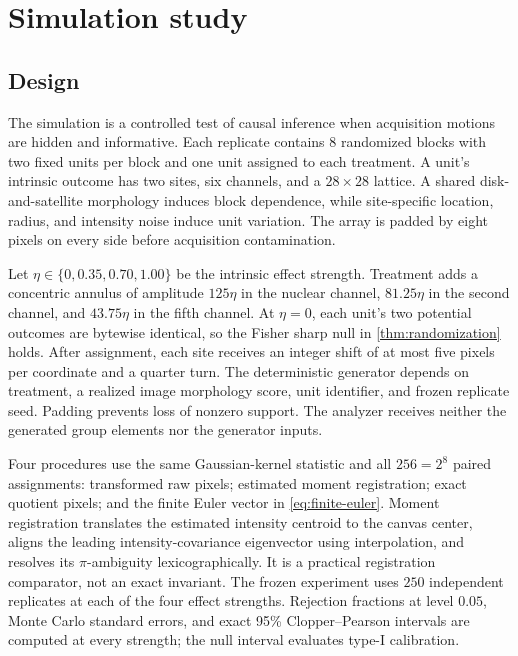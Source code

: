 \documentclass[11pt]{article}
\theoremstyle{definition}
\theoremstyle{remark}
\newcommand{\1}{\mathbf 1}
\providecommand{\SimReplicatesPerEffect}{250}
\providecommand{\SimBlocks}{8}
\providecommand{\SimPermutationCount}{256}
\begin{document}
\section{Simulation study}

\subsection{Design}

The simulation is a controlled test of causal inference when acquisition
motions are hidden and informative.  Each replicate contains
\(\SimBlocks\) randomized blocks with two fixed units per block and one unit
assigned to each treatment.  A unit's intrinsic outcome has two sites, six
channels, and a \(28\times28\) lattice.  A shared disk-and-satellite morphology
induces block dependence, while site-specific location, radius, and intensity
noise induce unit variation.  The array is padded by eight pixels on every
side before acquisition contamination.

Let \(\eta\in\{0,0.35,0.70,1.00\}\) be the intrinsic effect strength.  Treatment
adds a concentric annulus of amplitude \(125\eta\) in the nuclear channel,
\(81.25\eta\) in the second channel, and \(43.75\eta\) in the fifth channel.
At \(\eta=0\), each unit's two potential outcomes are bytewise identical, so
the Fisher sharp null in \cref{thm:randomization} holds.  After assignment, each
site receives an integer shift of at most five pixels per coordinate and a
quarter turn.  The deterministic generator depends on treatment, a realized
image morphology score, unit identifier, and frozen replicate seed.  Padding
prevents loss of nonzero support.  The analyzer receives neither the generated
group elements nor the generator inputs.

Four procedures use the same Gaussian-kernel statistic and all
\(\SimPermutationCount=2^{\SimBlocks}\) paired assignments: transformed raw
pixels; estimated moment registration; exact quotient pixels; and the finite
Euler vector in \eqref{eq:finite-euler}.  Moment registration translates the
estimated intensity centroid to the canvas center, aligns the leading
intensity-covariance eigenvector using interpolation, and resolves its
\(\pi\)-ambiguity lexicographically.  It is a practical registration comparator,
not an exact invariant.  The frozen experiment uses
\(\SimReplicatesPerEffect\) independent replicates at each of the four effect
strengths.  Rejection fractions at level \(0.05\), Monte Carlo standard errors,
and exact 95\% Clopper--Pearson intervals are computed at every strength; the
null interval evaluates type-I calibration.
\end{document}
